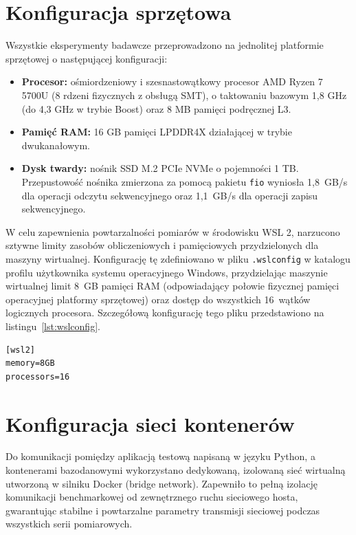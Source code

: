 \section{Konfiguracja sprzętowa}
Wszystkie eksperymenty badawcze przeprowadzono na jednolitej platformie sprzętowej o następującej konfiguracji:
\begin{itemize}
    \item \textbf{Procesor:} ośmiordzeniowy i szesnastowątkowy procesor AMD Ryzen 7 5700U (8 rdzeni fizycznych z obsługą SMT), o taktowaniu bazowym 1,8 GHz (do 4,3 GHz w trybie Boost) oraz 8 MB pamięci podręcznej L3.
    \item \textbf{Pamięć RAM:} 16 GB pamięci LPDDR4X działającej w trybie dwukanałowym.
    \item \textbf{Dysk twardy:} nośnik SSD M.2 PCIe NVMe o pojemności 1 TB. Przepustowość nośnika zmierzona za pomocą pakietu \texttt{fio} wyniosła 1,8~GB/s dla operacji odczytu sekwencyjnego oraz 1,1~GB/s dla operacji zapisu sekwencyjnego.
\end{itemize}
W celu zapewnienia powtarzalności pomiarów w środowisku WSL 2, narzucono sztywne limity zasobów obliczeniowych i pamięciowych przydzielonych dla maszyny wirtualnej. Konfigurację tę zdefiniowano w pliku \texttt{.wslconfig} w katalogu profilu użytkownika systemu operacyjnego Windows, przydzielając maszynie wirtualnej limit 8~GB pamięci RAM (odpowiadający połowie fizycznej pamięci operacyjnej platformy sprzętowej) oraz dostęp do wszystkich 16~wątków logicznych procesora. Szczegółową konfigurację tego pliku przedstawiono na listingu~\ref{lst:wslconfig}.

\begin{lstlisting}[label={lst:wslconfig},caption={Konfiguracja zasobów środowiska WSL 2 w pliku .wslconfig}]
[wsl2]
memory=8GB
processors=16
\end{lstlisting}

\section{Konfiguracja sieci kontenerów}
Do komunikacji pomiędzy aplikacją testową napisaną w języku Python, a kontenerami bazodanowymi wykorzystano dedykowaną, izolowaną sieć wirtualną utworzoną w silniku Docker (bridge network). Zapewniło to pełną izolację komunikacji benchmarkowej od zewnętrznego ruchu sieciowego hosta, gwarantując stabilne i powtarzalne parametry transmisji sieciowej podczas wszystkich serii pomiarowych.

